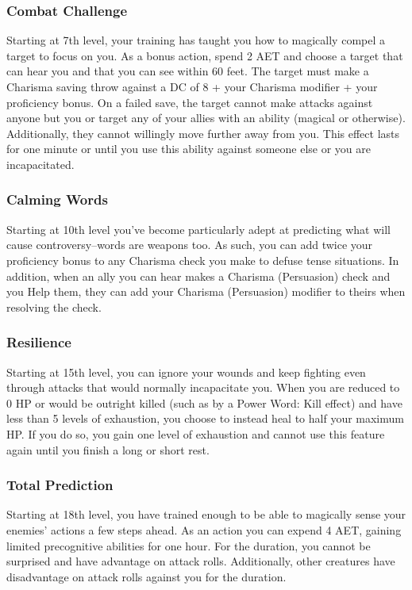 \subsubsection{Combat Challenge}
Starting at 7th level, your training has taught you how to magically compel a target to focus on you. As a bonus action, spend 2 AET and choose a target that can hear you and that you can see within 60 feet. The target must make a Charisma saving throw against a DC of 8 + your Charisma modifier + your proficiency bonus. On a failed save, the target cannot make attacks against anyone but you or target any of your allies with an ability (magical or otherwise). Additionally, they cannot willingly move further away from you. This effect lasts for one minute or until you use this ability against someone else or you are incapacitated.

\subsubsection{Calming Words}
Starting at 10th level you've become particularly adept at predicting what will cause controversy--words are weapons too. As such, you can add twice your proficiency bonus to any Charisma check you make to defuse tense situations. In addition, when an ally you can hear makes a Charisma (Persuasion) check and you Help them, they can add your Charisma (Persuasion) modifier to theirs when resolving the check.

\subsubsection{Resilience}
Starting at 15th level, you can ignore your wounds and keep fighting even through attacks that would normally incapacitate you. When you are reduced to 0 HP or would be outright killed (such as by a Power Word: Kill effect) and have less than 5 levels of exhaustion, you choose to instead heal to half your maximum HP. If you do so, you gain one level of exhaustion and cannot use this feature again until you finish a long or short rest.

\subsubsection{Total Prediction}
Starting at 18th level, you have trained enough to be able to magically sense your enemies' actions a few steps ahead. As an action you can expend 4 AET, gaining limited precognitive abilities for one hour. For the duration, you cannot be surprised and have advantage on attack rolls. Additionally, other creatures have disadvantage on attack rolls against you for the duration.


